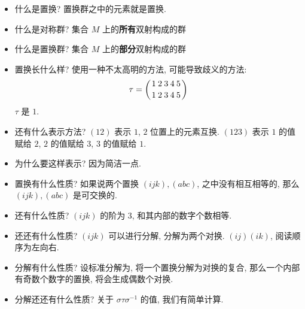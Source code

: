 \documentclass[12pt]{ctexart}
\theoremstyle{definition}
\theoremstyle{remark}
\begin{document}
\begin{itemize}
\item 什么是置换? 置换群之中的元素就是置换. 
\item 什么是对称群? 集合 \(M\) 上的\textbf{所有}双射构成的群
\item 什么是置换群? 集合 \(M\) 上的\textbf{部分}双射构成的群
\item 置换长什么样? 使用一种不太高明的方法, 可能导致歧义的方法: 
	\[
		\tau = \left( { 1 \atop 1}{ 2 \atop 2}{ 3 \atop 3}{ 4 \atop 4}{ 5 \atop 5}  \right)
	\]
	\(\tau \) 是 \(1\).
\item 还有什么表示方法? \((12)\) 表示 \(1\), \(2\) 位置上的元素互换. \((123)\) 表示 \(1\) 的值赋给 \(2\), \(2\) 的值赋给 \(3\), \(3\) 的值赋给 \(1\). 
\item 为什么要这样表示? 因为简洁一点. 
\item 置换有什么性质? 如果说两个置换 \((ijk), (abc)\), 之中没有相互相等的, 那么 \( (ijk), (abc)\) 是可交换的. 
\item 还有什么性质? \((ijk)\) 的阶为 \(3\), 和其内部的数字个数相等. 
\item 还还有什么性质? \( (i j k)\) 可以进行分解, 分解为两个对换. \((ij)(ik)\), 阅读顺序为左向右.
\item 分解有什么性质? 设标准分解为, 将一个置换分解为对换的复合, 那么一个内部有奇数个数字的置换, 将会生成偶数个对换. 
\item 分解还还有什么性质? 关于 \( \sigma  \tau\sigma ^{-1}\) 的值, 我们有简单计算. 
\end{itemize}
\end{document}
